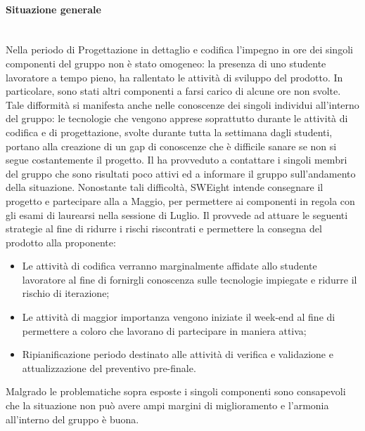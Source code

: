 \paragraph{Situazione generale} \mbox{}\\
Nella periodo di Progettazione in dettaglio e codifica l'impegno in ore dei singoli componenti del gruppo non è stato omogeneo: la presenza di uno studente lavoratore a tempo pieno, ha rallentato le attività di sviluppo del prodotto. In particolare, sono stati altri componenti a farsi carico di alcune ore non svolte. Tale difformità si manifesta anche nelle conoscenze dei singoli individui all'interno del gruppo: le tecnologie che vengono apprese soprattutto durante le attività di codifica e di progettazione, svolte durante tutta la settimana dagli studenti, portano alla creazione di un gap di conoscenze che è difficile sanare se non si segue costantemente il progetto. Il \RdP{} ha provveduto a contattare i singoli membri del gruppo che sono risultati poco attivi ed a informare il gruppo sull'andamento della situazione. Nonostante tali difficoltà, SWEight intende consegnare il progetto e partecipare alla \RA{} a Maggio, per permettere ai componenti in regola con gli esami di laurearsi nella sessione di Luglio. Il \RdP{} provvede ad attuare le seguenti strategie al fine di ridurre i rischi riscontrati e permettere la consegna del prodotto alla proponente:
\begin{itemize}
	\item Le attività di codifica verranno marginalmente affidate allo studente lavoratore al fine di fornirgli conoscenza sulle tecnologie impiegate e ridurre il rischio di iterazione;
	\item Le attività di maggior importanza vengono iniziate il week-end al fine di permettere a coloro che lavorano di partecipare in maniera attiva;
	\item Ripianificazione periodo destinato alle attività di verifica e validazione e attualizzazione del preventivo pre-finale.
\end{itemize}
Malgrado le problematiche sopra esposte i singoli componenti sono consapevoli che la situazione non può avere ampi margini di miglioramento e l'armonia all'interno del gruppo è buona.\\

